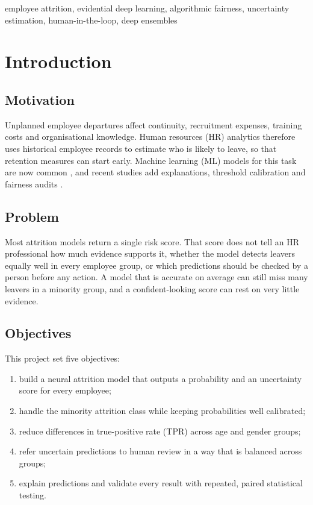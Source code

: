 \documentclass[conference]{IEEEtran}
\begin{document}
\begin{IEEEkeywords}
employee attrition, evidential deep learning, algorithmic fairness, uncertainty estimation, human-in-the-loop, deep ensembles
\end{IEEEkeywords}

\section{Introduction}
\subsection{Motivation}
Unplanned employee departures affect continuity, recruitment expenses, training costs and organisational knowledge. Human resources (HR) analytics therefore uses historical employee records to estimate who is likely to leave, so that retention measures can start early. Machine learning (ML) models for this task are now common \cite{talebi2025,alakasheh2024decade}, and recent studies add explanations, threshold calibration and fairness audits \cite{jia2026,alali2026,chaudhary2025}.

\subsection{Problem}
Most attrition models return a single risk score. That score does not tell an HR professional how much evidence supports it, whether the model detects leavers equally well in every employee group, or which predictions should be checked by a person before any action. A model that is accurate on average can still miss many leavers in a minority group, and a confident-looking score can rest on very little evidence.

\subsection{Objectives}
This project set five objectives:
\begin{enumerate}
\item build a neural attrition model that outputs a probability and an uncertainty score for every employee;
\item handle the minority attrition class while keeping probabilities well calibrated;
\item reduce differences in true-positive rate (TPR) across age and gender groups;
\item refer uncertain predictions to human review in a way that is balanced across groups;
\item explain predictions and validate every result with repeated, paired statistical testing.
\end{enumerate}
\end{document}
